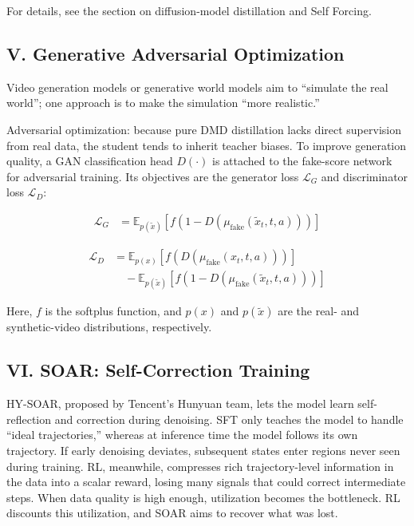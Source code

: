 For details, see the section on diffusion-model distillation and Self Forcing.

\hypertarget{v.-generative-adversarial-optimization}{%
\subsection{V. Generative Adversarial Optimization}\label{v.-generative-adversarial-optimization}}

Video generation models or generative world models aim to ``simulate the real world''; one approach is to make the simulation ``more realistic.''

Adversarial optimization: because pure DMD distillation lacks direct supervision from real data, the student tends to inherit teacher biases. To improve generation quality, a GAN classification head \(D(\cdot)\) is attached to the fake-score network for adversarial training. Its objectives are the generator loss \(\mathcal{L}_G\) and discriminator loss \(\mathcal{L}_D\):

\[
\begin{aligned}
\mathcal{L}_G
&=
\mathbb{E}_{p(\tilde{x})}
\left[
f\left(1-D(\mu_{\mathrm{fake}}(\tilde{x}_t,t,a))\right)
\right]
\end{aligned}
\]

\[
\begin{aligned}
\mathcal{L}_D
&=
\mathbb{E}_{p(x)}
\left[
f\left(D(\mu_{\mathrm{fake}}(x_t,t,a))\right)
\right]
\\
&\quad -
\mathbb{E}_{p(\tilde{x})}
\left[
f\left(1-D(\mu_{\mathrm{fake}}(\tilde{x}_t,t,a))\right)
\right]
\end{aligned}
\]

Here, \(f\) is the softplus function, and \(p(x)\) and \(p(\tilde{x})\) are the real- and synthetic-video distributions, respectively.

\hypertarget{vi.-soar-self-correction-training}{%
\subsection{VI. SOAR: Self-Correction Training}\label{vi.-soar-self-correction-training}}

HY-SOAR, proposed by Tencent's Hunyuan team, lets the model learn self-reflection and correction during denoising. SFT only teaches the model to handle ``ideal trajectories,'' whereas at inference time the model follows its own trajectory. If early denoising deviates, subsequent states enter regions never seen during training. RL, meanwhile, compresses rich trajectory-level information in the data into a scalar reward, losing many signals that could correct intermediate steps. When data quality is high enough, utilization becomes the bottleneck. RL discounts this utilization, and SOAR aims to recover what was lost.

